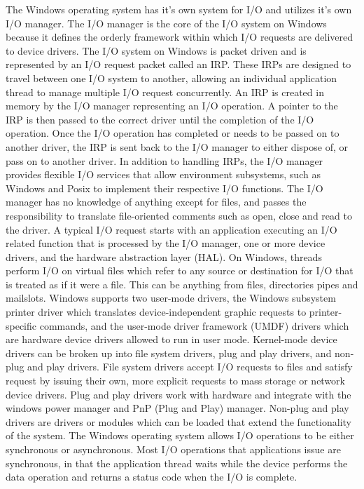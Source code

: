\documentclass[letterpaper,10pt,draftclsnofoot,onecolumn,titlepage]{IEEEtran}
\begin{document}
		The Windows operating system has it's own system for I/O and utilizes it's own I/O manager.
		The I/O manager is the core of the I/O system on Windows because it defines the orderly framework within which I/O requests are delivered to device drivers. \cite{Windows}
		The I/O system on Windows is packet driven and is represented by an I/O request packet called an IRP.
		These IRPs are designed to travel between one I/O system to another, allowing an individual application thread to manage multiple I/O request concurrently.
		An IRP is created in memory by the I/O manager representing an I/O operation.
		A pointer to the IRP is then passed to the correct driver until the completion of the I/O operation.
		Once the I/O operation has completed or needs to be passed on to another driver, the IRP is sent back to the I/O manager to either dispose of, or pass on to another driver.
		In addition to handling IRPs, the I/O manager provides flexible I/O services that allow environment subsystems, such as Windows and Posix to implement their respective I/O functions.
		The I/O manager has no knowledge of anything except for files, and passes the responsibility to translate file-oriented comments such as open, close and read to the driver.
		A typical I/O request starts with an application executing an I/O related function that is processed by the I/O manager, one or more device drivers, and the hardware abstraction layer (HAL).
		On Windows, threads perform I/O on virtual files which refer to any source or destination for I/O that is treated as if it were a file.
		This can be anything from files, directories pipes and mailslots.
		Windows supports two user-mode drivers, the Windows subsystem printer driver which translates device-independent graphic requests to printer-specific commands, and the user-mode driver framework (UMDF) drivers which are hardware device drivers allowed to run in user mode.
		Kernel-mode device drivers can be broken up into file system drivers, plug and play drivers, and non-plug and play drivers.
		File system drivers accept I/O requests to files and satisfy request by issuing their own, more explicit requests to mass storage or network device drivers.
		Plug and play drivers work with hardware and integrate with the windows power manager and PnP (Plug and Play) manager.
		Non-plug and play drivers are drivers or modules which can be loaded that extend the functionality of the system.
		The Windows operating system allows I/O operations to be either synchronous or asynchronous.
		Most I/O operations that applications issue are synchronous, in that the application thread waits while the device performs the data operation and returns a status code when the I/O is complete.
\end{document}
